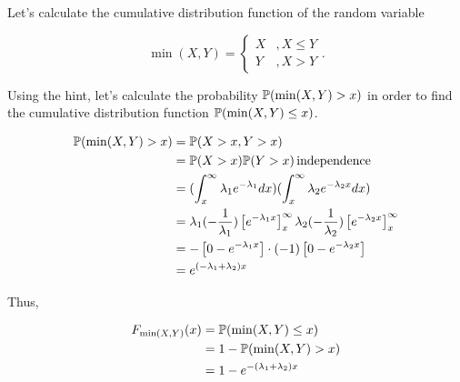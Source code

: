 
Let's calculate the cumulative distribution function of the random variable 

\[
    \min(X,Y) = \begin{cases}
	X & , X\leq Y\\
	Y & , X > Y
    \end{cases}
.\] 

Using the hint, let's calculate the probability $ \P(\min(X,Y) > x)$ in order to find the cumulative
distribution function $ \P(\min(X,Y)\leq x) $. 

\begin{align*}
    \P(\min(X,Y) > x) &= \P(X > x, Y > x)\\
		      &= \P(X > x) \P(Y > x) \, \mbox{independence} \\
		      &= ( \int_{x}^{\infty} \lambda_1 e^{-\lambda_1} dx) ( \int_{x}^{\infty}
		      \lambda_2 e^{-\lambda_2 x} dx) \\
		      &= \lambda_1 (- \frac{1}{\lambda_1} )\left[e^{-\lambda_1 x}\right]_{x}^{\infty}
		      \lambda_2 (- \frac{1}{\lambda_2}) \left[ e^{-\lambda_2 x}
		      \right]_{x}^{\infty}\\
		      &= - \left[ 0 - e^{-\lambda_1 x}  \right] \cdot (-1) \left[ 0 - e^{-\lambda_2
		      x}  \right] \\
		      &= e^{(-\lambda_1 + \lambda_2)x} 
\end{align*}

Thus,

\begin{align*}
    F_{\min(X,Y)} (x) &= \P(\min(X,Y) \leq x)\\
		      &= 1- \P(\min(X,Y) > x)\\
		      &= 1- e^{- (\lambda_1 + \lambda_2) x} 
\end{align*}

